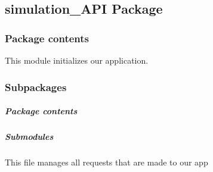 \documentclass[a4paper,landscape,10pt,english]{sphinxmanual}
\begin{document}
\subsection{simulation\_API Package}
\label{\detokenize{code_docs/simulation_API:simulation-api-package}}\label{\detokenize{code_docs/simulation_API:code-api-package}}\label{\detokenize{code_docs/simulation_API::doc}}

\subsubsection{Package contents}
\label{\detokenize{code_docs/simulation_API:module-simulation_API}}\label{\detokenize{code_docs/simulation_API:package-contents}}
This module initializes our application.


\subsubsection{Subpackages}
\label{\detokenize{code_docs/simulation_API:subpackages}}

\paragraph{}
\label{\detokenize{code_docs/simulation_API.controller:simulation-api-controller}}\label{\detokenize{code_docs/simulation_API.controller::doc}}

\subparagraph{Package contents}
\label{\detokenize{code_docs/simulation_API.controller:module-simulation_API.controller}}\label{\detokenize{code_docs/simulation_API.controller:package-contents}}

\subparagraph{Submodules}
\label{\detokenize{code_docs/simulation_API.controller:submodules}}

\subparagraph{}
\label{\detokenize{code_docs/simulation_API.controller:module-simulation_API.controller.main}}\label{\detokenize{code_docs/simulation_API.controller:simulation-api-controller-main}}
This file manages all requests that are made to our app
\end{document}
